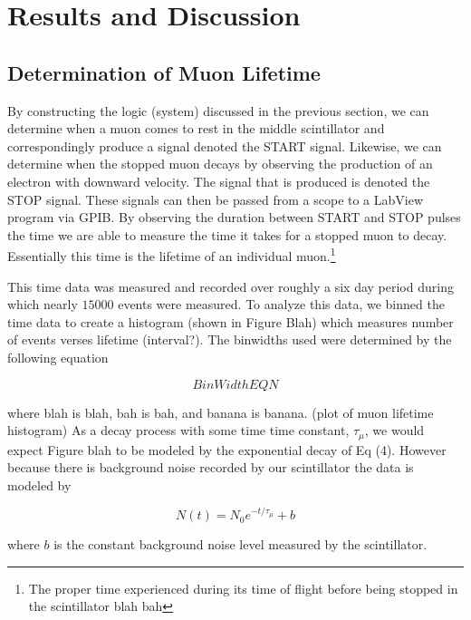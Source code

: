 
\section{Results and Discussion}

\subsection{Determination of Muon Lifetime}

By constructing the logic (system) discussed in the previous section, we can determine when a muon comes to rest in the middle scintillator and correspondingly produce a signal denoted the START signal.  Likewise, we can determine when the stopped muon decays by observing the production of an electron with downward velocity.  The signal that is produced is denoted the STOP signal.  These signals can then be passed from a scope to a LabView program via GPIB.  By observing the duration between START and STOP pulses the time we are able to measure the time it takes for a stopped muon to decay.  Essentially this time is the lifetime of an individual muon.\footnote{The proper time experienced during its time of flight before being stopped in the scintillator blah bah}  

This time data was measured and recorded over roughly a six day period during which nearly $15000$ events were measured.  To analyze this data, we binned the time data to create a histogram (shown in Figure Blah) which measures number of events verses lifetime (interval?).  The binwidths used were determined by the following equation

\begin{equation}
Bin Width EQN
\end{equation}

where blah is blah, bah is bah, and banana is banana.
(plot of muon lifetime histogram)
As a decay process with some time time constant, $\tau_{\mu}$, we would expect Figure blah to be modeled by the exponential decay of Eq (4).  However because there is background noise recorded by our scintillator the data is modeled by 

\begin{equation}
N(t) = N_{0} e^{-t/\tau_{\mu}}+b
\end{equation}

where $b$ is the constant background noise level measured by the scintillator. 

